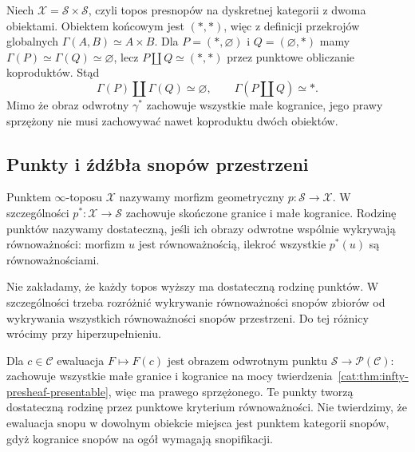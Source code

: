 \begin{przyklad}\label{cat:ex:infty-topos-global-sections-coproduct}
Niech $\mathcal X=\mathcal S\times\mathcal S$, czyli topos presnopów na dyskretnej kategorii z dwoma obiektami. Obiektem końcowym jest $(*,*)$, więc z definicji przekrojów globalnych $\Gamma(A,B)\simeq A\times B$. Dla $P=(*,\varnothing)$ i $Q=(\varnothing,*)$ mamy $\Gamma(P)\simeq\Gamma(Q)\simeq\varnothing$, lecz $P\coprod Q\simeq(*,*)$ przez punktowe obliczanie koproduktów. Stąd
\[
 \Gamma(P)\coprod\Gamma(Q)\simeq\varnothing,
 \qquad
 \Gamma(P\coprod Q)\simeq *.
\]
Mimo że obraz odwrotny $\gamma^*$ zachowuje wszystkie małe kogranice, jego prawy sprzężony nie musi zachowywać nawet koproduktu dwóch obiektów.
\end{przyklad}

\subsection{Punkty i źdźbła snopów przestrzeni}

\begin{definicja}\label{cat:def:infty-topos-point}
Punktem $\infty$-toposu $\mathcal X$ nazywamy morfizm geometryczny $p:\mathcal S\to\mathcal X$. W szczególności $p^*:\mathcal X\to\mathcal S$ zachowuje skończone granice i małe kogranice. Rodzinę punktów nazywamy dostateczną, jeśli ich obrazy odwrotne wspólnie wykrywają równoważności: morfizm $u$ jest równoważnością, ilekroć wszystkie $p^*(u)$ są równoważnościami.
\end{definicja}

Nie zakładamy, że każdy topos wyższy ma dostateczną rodzinę punktów. W szczególności trzeba rozróżnić wykrywanie równoważności snopów zbiorów od wykrywania wszystkich równoważności snopów przestrzeni. Do tej różnicy wrócimy przy hiperzupełnieniu.

\begin{przyklad}\label{cat:ex:infty-topos-evaluation-point}
Dla $c\in\mathcal C$ ewaluacja $F\mapsto F(c)$ jest obrazem odwrotnym punktu $\mathcal S\to\mathcal P(\mathcal C)$: zachowuje wszystkie małe granice i kogranice na mocy twierdzenia~\ref{cat:thm:infty-presheaf-presentable}, więc ma prawego sprzężonego. Te punkty tworzą dostateczną rodzinę przez punktowe kryterium równoważności. Nie twierdzimy, że ewaluacja snopu w dowolnym obiekcie miejsca jest punktem kategorii snopów, gdyż kogranice snopów na ogół wymagają snopifikacji.
\end{przyklad}

